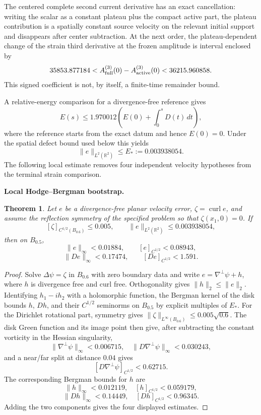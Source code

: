 \documentclass[11pt]{article}
\newtheorem{theorem}{Theorem}[section]\newtheorem{proposition}[theorem]{Proposition}
\theoremstyle{definition}\newtheorem{definition}[theorem]{Definition}\newtheorem{problem}[theorem]{Problem}
\theoremstyle{remark}\newtheorem{remark}[theorem]{Remark}
\begin{document}
The centered complete second current derivative has an exact cancellation: writing the scalar as a constant plateau plus the compact active part, the plateau contribution is a spatially constant source velocity on the relevant initial support and disappears after center subtraction.  At the next order, the plateau-dependent change of the strain third derivative at the frozen amplitude is interval enclosed by
\[
35853.877184
< A^{(3)}_{\rm full}(0)-A^{(3)}_{\rm active}(0)
<36215.960858.
\]
This signed coefficient is not, by itself, a finite-time remainder bound.

A relative-energy comparison for a divergence-free reference gives
\[
E(s)\le1.970012\left(E(0)+\int_0^sD(t)\,dt\right),
\]
where the reference starts from the exact datum and hence $E(0)=0$.  Under the spatial defect bound used below this yields
\[
\|e\|_{L^2(\mathbb R^2)}\le E_*:=0.003938054.
\]
The following local estimate removes four independent velocity hypotheses from the terminal strain comparison.

\medskip
\noindent\textbf{Local Hodge--Bergman bootstrap.}
\begin{theorem}\label{thm:local-hodge-bootstrap}
Let $e$ be a divergence-free planar velocity error, $\zeta=\operatorname{curl}e$, and assume the reflection symmetry of the specified problem so that $\zeta(x_1,0)=0$.  If
\[
[\zeta]_{C^{1/2}(B_{0.6})}\le0.005,
\qquad
\|e\|_{L^2(\mathbb R^2)}\le0.003938054,
\]
then on $B_{0.5}$,
\[
\|e\|_\infty<0.01884,
\qquad
[e]_{C^{1/2}}<0.08943,
\]
\[
\|De\|_\infty<0.17474,
\qquad
[De]_{C^{1/2}}<1.591.
\]
\end{theorem}
\begin{proof}
Solve $\Delta\psi=\zeta$ in $B_{0.6}$ with zero boundary data and write
$e=\nabla^\perp\psi+h$, where $h$ is divergence free and curl free.  Orthogonality gives $\|h\|_2\le\|e\|_2$.  Identifying $h_1-ih_2$ with a holomorphic function, the Bergman kernel of the disk bounds $h$, $Dh$, and their $C^{1/2}$ seminorms on $B_{0.5}$ by explicit multiples of $E_*$.  For the Dirichlet rotational part, symmetry gives
$\|\zeta\|_{L^\infty(B_{0.6})}\le0.005\sqrt{0.6}$.  The disk Green function and its image point then give, after subtracting the constant vorticity in the Hessian singularity,
\[
\|\nabla^\perp\psi\|_\infty<0.006715,
\quad
\|D\nabla^\perp\psi\|_\infty<0.030243,
\]
and a near/far split at distance $0.04$ gives
\[
[D\nabla^\perp\psi]_{C^{1/2}}<0.62715.
\]
The corresponding Bergman bounds for $h$ are
\[
\|h\|_\infty<0.012119,
\quad
[h]_{C^{1/2}}<0.059179,
\]
\[
\|Dh\|_\infty<0.14449,
\quad
[Dh]_{C^{1/2}}<0.96345.
\]
Adding the two components gives the four displayed estimates.
\end{proof}
\end{document}
